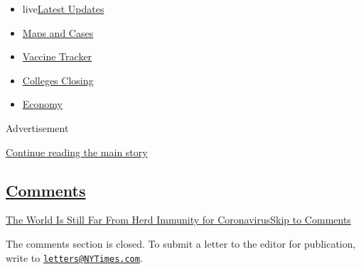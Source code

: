 \begin{itemize}
\tightlist
\item
  live\href{https://www.nytimes3xbfgragh.onion/2020/08/21/world/covid-19-coronavirus.html?name=styln-coronavirus-national\&region=TOP_BANNER\&variant=undefined\&block=storyline_menu_recirc\&action=click\&pgtype=Interactive\&impression_id=82050881-e39d-11ea-8096-716e66d3d197}{Latest
  Updates}
\item
  \href{https://www.nytimes3xbfgragh.onion/interactive/2020/us/coronavirus-us-cases.html?name=styln-coronavirus-national\&region=TOP_BANNER\&variant=undefined\&block=storyline_menu_recirc\&action=click\&pgtype=Interactive\&impression_id=82052f90-e39d-11ea-8096-716e66d3d197}{Maps
  and Cases}
\item
  \href{https://www.nytimes3xbfgragh.onion/interactive/2020/science/coronavirus-vaccine-tracker.html?name=styln-coronavirus-national\&region=TOP_BANNER\&variant=undefined\&block=storyline_menu_recirc\&action=click\&pgtype=Interactive\&impression_id=82052f91-e39d-11ea-8096-716e66d3d197}{Vaccine
  Tracker}
\item
  \href{https://www.nytimes3xbfgragh.onion/2020/08/19/us/colleges-closing-covid.html?name=styln-coronavirus-national\&region=TOP_BANNER\&variant=undefined\&block=storyline_menu_recirc\&action=click\&pgtype=Interactive\&impression_id=82052f92-e39d-11ea-8096-716e66d3d197}{Colleges
  Closing}
\item
  \href{https://www.nytimes3xbfgragh.onion/live/2020/08/20/business/stock-market-today-coronavirus?name=styln-coronavirus-national\&region=TOP_BANNER\&variant=undefined\&block=storyline_menu_recirc\&action=click\&pgtype=Interactive\&impression_id=82052f93-e39d-11ea-8096-716e66d3d197}{Economy}
\end{itemize}

Advertisement

\protect\hyperlink{after-top}{Continue reading the main story}

\hypertarget{comments}{%
\subsection{\texorpdfstring{\protect\hyperlink{commentsContainer}{Comments}}{Comments}}\label{comments}}

\href{}{The World Is Still Far From Herd Immunity for
Coronavirus}\href{}{Skip to Comments}

The comments section is closed. To submit a letter to the editor for
publication, write to
\href{mailto:letters@NYTimes.com}{\nolinkurl{letters@NYTimes.com}}.

